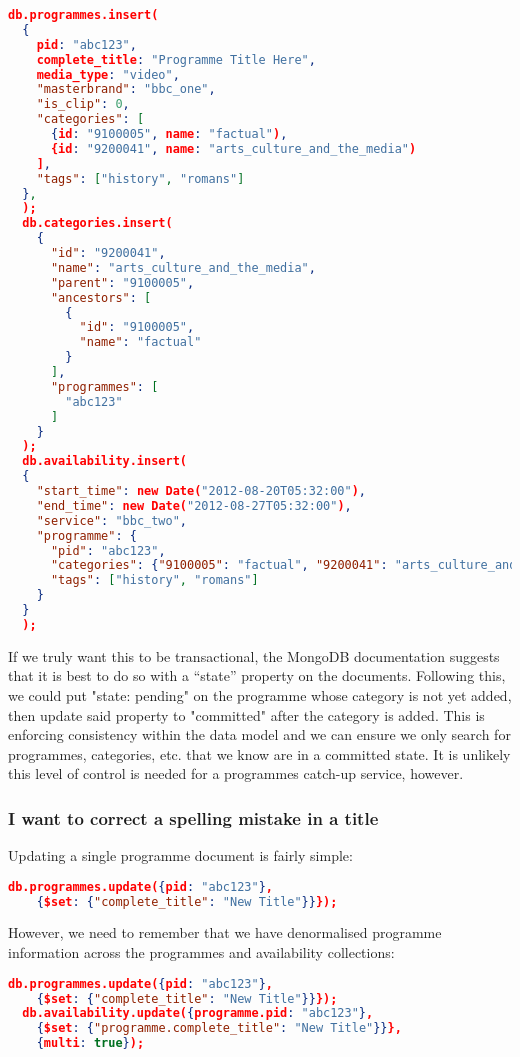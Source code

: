\documentclass[11pt,a4paper]{article}
\begin{document}
\begin{lstlisting}[language=json]
  db.programmes.insert(
  {
    pid: "abc123",
    complete_title: "Programme Title Here",
    media_type: "video",
    "masterbrand": "bbc_one",
    "is_clip": 0,
    "categories": [
      {id: "9100005", name: "factual"),
      {id: "9200041", name: "arts_culture_and_the_media")
    ],
    "tags": ["history", "romans"]
  },
  );
  db.categories.insert(
    {
      "id": "9200041",
      "name": "arts_culture_and_the_media",
      "parent": "9100005",
      "ancestors": [
        {
          "id": "9100005",
          "name": "factual"
        }
      ],
      "programmes": [
        "abc123"
      ]
    }
  );
  db.availability.insert(
  {
    "start_time": new Date("2012-08-20T05:32:00"),
    "end_time": new Date("2012-08-27T05:32:00"),
    "service": "bbc_two",
    "programme": {
      "pid": "abc123",
      "categories": {"9100005": "factual", "9200041": "arts_culture_and_the_media"},
      "tags": ["history", "romans"]
    }
  }
  );
\end{lstlisting}

If we truly want this to be transactional, the MongoDB
documentation suggests \cite{mongo-two-phase-commits} that it
is best to do so with a ``state'' property on the documents.
Following this, we could put "state: pending" on the programme
whose category is not yet added, then update said property
to "committed" after the category is added. This is enforcing
consistency within the data model and we can ensure we only
search for programmes, categories, etc. that we know are in
a committed state. It is unlikely this level of control is needed
for a programmes catch-up service, however.

\subsubsection{I want to correct a spelling mistake in a title}

Updating a single programme document is fairly simple:

\begin{lstlisting}[language=json]
  db.programmes.update({pid: "abc123"},
    {$set: {"complete_title": "New Title"}}});
\end{lstlisting}

However, we need to remember that we have denormalised programme
information across the programmes and availability collections:

\begin{lstlisting}[language=json]
  db.programmes.update({pid: "abc123"},
    {$set: {"complete_title": "New Title"}}});
  db.availability.update({programme.pid: "abc123"},
    {$set: {"programme.complete_title": "New Title"}}},
    {multi: true});
\end{lstlisting}
\end{document}
